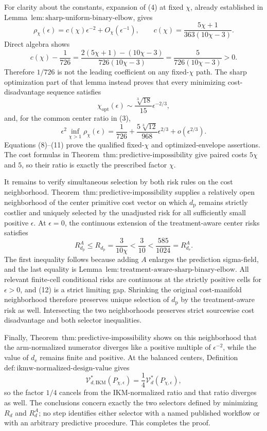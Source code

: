 For clarity about the constants, expansion of (4) at fixed \(\chi\), already established in Lemma~\(\mathrm{lem{:}sharp\text{-}uniform\text{-}binary\text{-}elbow}\), gives
\[
 \rho_\chi(\epsilon)
 =c(\chi)\epsilon^{-2}+O_\chi(\epsilon^{-1}),
 \qquad
 c(\chi)=\frac{5\chi+1}{363(10\chi-3)}. \tag{8}
\]
Direct algebra shows
\[
 c(\chi)-\frac1{726}
 =\frac{2(5\chi+1)-(10\chi-3)}{726(10\chi-3)}
 =\frac5{726(10\chi-3)}>0. \tag{9}
\]
Therefore \(1/726\) is not the leading coefficient on any fixed-\(\chi\) path. The sharp optimization part of that lemma instead proves that every minimizing cost-disadvantage sequence satisfies
\[
 \chi_{\mathrm{opt}}(\epsilon)
 \sim\frac{\sqrt[3]{18}}{15}\epsilon^{-2/3}, \tag{10}
\]
and, for the common center ratio in (3),
\[
 \epsilon^2\inf_{\chi>1}\rho_\chi(\epsilon)
 =\frac1{726}
 +\frac{5\sqrt[3]{12}}{968}\epsilon^{2/3}
 +o(\epsilon^{2/3}). \tag{11}
\]
Equations (8)--(11) prove the qualified fixed-\(\chi\) and optimized-envelope assertions. The cost formulas in Theorem~\(\mathrm{thm{:}predictive\text{-}impossibility}\) give paired costs \(5\chi\) and \(5\), so their ratio is exactly the prescribed factor \(\chi\).

It remains to verify simultaneous selection by both risk rules on the cost neighborhood. Theorem~\(\mathrm{thm{:}predictive\text{-}impossibility}\) supplies a relatively open neighborhood of the center primitive cost vector on which \(d_{\mathrm p}\) remains strictly costlier and uniquely selected by the unadjusted risk for all sufficiently small positive \(\epsilon\). At \(\epsilon=0\), the continuous extension of the treatment-aware center risks satisfies
\[
 R_{d_{\mathrm p}}^A
 \le R_{d_{\mathrm p}}
 =\frac3{10\chi}
 <\frac3{10}
 <\frac{585}{1024}
 =R_{d_{\mathrm e}}^A. \tag{12}
\]
The first inequality follows because adding \(A\) enlarges the prediction sigma-field, and the last equality is Lemma~\(\mathrm{lem{:}treatment\text{-}aware\text{-}sharp\text{-}binary\text{-}elbow}\). All relevant finite-cell conditional risks are continuous at the strictly positive cells for \(\epsilon>0\), and (12) is a strict limiting gap. Shrinking the original cost-manifold neighborhood therefore preserves unique selection of \(d_{\mathrm p}\) by the treatment-aware risk as well. Intersecting the two neighborhoods preserves strict sourcewise cost disadvantage and both selector inequalities.

Finally, Theorem~\(\mathrm{thm{:}predictive\text{-}impossibility}\) shows on this neighborhood that the arm-normalized numerator diverges like a positive multiple of \(\epsilon^{-2}\), while the value of \(d_{\mathrm e}\) remains finite and positive. At the balanced centers, Definition~\(\mathrm{def{:}ikmw\text{-}normalized\text{-}design\text{-}value}\) gives
\[
 \mathcal V_{d,\mathrm{IKM}}^*(P_{\chi,\epsilon})
 =\frac14\mathcal V_d^*(P_{\chi,\epsilon}), \tag{13}
\]
so the factor \(1/4\) cancels from the IKM-normalized ratio and that ratio diverges as well. The conclusions concern exactly the two selectors defined by minimizing \(R_d\) and \(R_d^A\); no step identifies either selector with a named published workflow or with an arbitrary predictive procedure. This completes the proof.